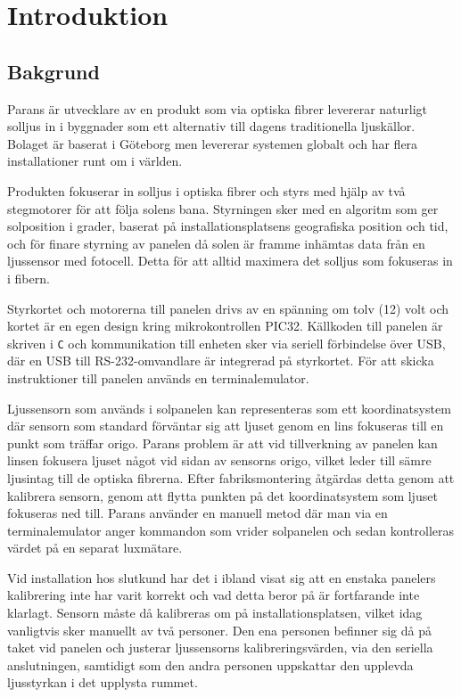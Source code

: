 \section{Introduktion} %
\label{sec:indroduktion}

    \subsection{Bakgrund} %
    \label{sub:bakgrund}
        Parans är utvecklare av en produkt som via optiska fibrer levererar naturligt solljus in i byggnader som ett alternativ till dagens traditionella ljuskällor. 
        Bolaget är baserat i Göteborg men levererar systemen globalt och har flera installationer runt om i världen. \bigskip

        Produkten fokuserar in solljus i optiska fibrer och styrs med hjälp av två stegmotorer för att följa solens bana. 
        Styrningen sker med en algoritm som ger solposition i grader, baserat på installationsplatsens geografiska position och tid, och för finare styrning av panelen då solen är framme inhämtas data från en ljussensor med fotocell.
        Detta för att alltid maximera det solljus som fokuseras in i fibern.\bigskip

        Styrkortet och motorerna till panelen drivs av en spänning om tolv (12) volt och kortet är en egen design kring mikrokontrollen PIC32. 
        Källkoden till panelen är skriven i \texttt{C} och kommunikation till enheten sker via seriell förbindelse över USB, där en USB till RS-232-omvandlare är integrerad på styrkortet. För att skicka instruktioner till panelen används en terminalemulator. \bigskip

        Ljussensorn som används i solpanelen kan representeras som ett koordinatsystem där sensorn som standard förväntar sig att ljuset genom en lins fokuseras till en punkt som träffar origo. 
        Parans problem är att vid tillverkning av panelen kan linsen fokusera ljuset något vid sidan av sensorns origo, vilket leder till sämre ljusintag till de optiska fibrerna.
        Efter fabriksmontering åtgärdas detta genom att kalibrera sensorn, genom att flytta punkten på det koordinatsystem som ljuset fokuseras ned till. Parans använder en manuell metod där man via en terminalemulator anger kommandon som vrider solpanelen och sedan kontrolleras värdet på en separat luxmätare. \bigskip

        Vid installation hos slutkund har det i ibland visat sig att en enstaka panelers kalibrering inte har varit korrekt och vad detta beror på är fortfarande inte klarlagt. Sensorn måste då kalibreras om på installationsplatsen, vilket idag vanligtvis sker manuellt av två personer.
        Den ena personen befinner sig då på taket vid panelen och justerar ljussensorns kalibreringsvärden, via den seriella anslutningen, samtidigt som den andra personen uppskattar den upplevda ljusstyrkan i det upplysta rummet. \bigskip

